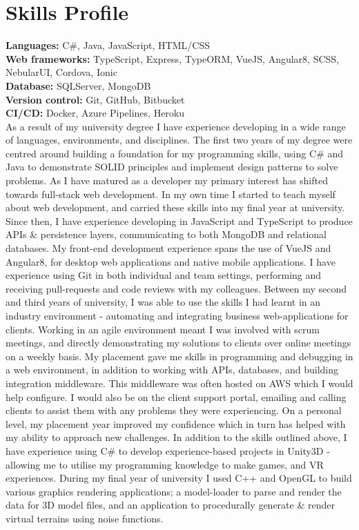 \documentclass[11pt]{article}
\begin{document}
\section*{Skills Profile}
{\bf Languages: } C\#, Java, JavaScript, HTML/CSS\\
{\bf Web frameworks: } TypeScript, Express, TypeORM, VueJS, Angular8, SCSS, NebularUI, Cordova, Ionic\\
{\bf Database: } SQLServer, MongoDB\\
{\bf Version control: } Git, GitHub, Bitbucket\\
{\bf CI/CD: } Docker, Azure Pipelines, Heroku\\[5pt]
As a result of my university degree I have experience developing in a wide range of languages, environments, and disciplines. The first two years of my degree were centred around building a foundation for my programming skills, using C\# and Java to demonstrate SOLID principles and implement design patterns to solve problems. As I have matured as a developer my primary interest has shifted towards full-stack web development. In my own time I started to teach myself about web development, and carried these skills into my final year at university. Since then, I have experience developing in JavaScript and TypeScript to produce APIs \& persistence layers, communicating to both MongoDB and relational databases. My front-end development experience spans the use of VueJS and Angular8, for desktop web applications and native mobile applications. I have experience using Git in both individual and team settings, performing and receiving pull-requests and code reviews with my colleagues.
\newline\newline
Between my second and third years of university, I was able to use the skills I had learnt in an industry environment - automating and integrating business web-applications for clients. Working in an agile environment meant I was involved with scrum meetings, and directly demonstrating my solutions to clients over online meetings on a weekly basis. My placement gave me skills in programming and debugging in a web environment, in addition to working with APIs, databases, and building integration middleware. This middleware was often hosted on AWS which I would help configure. I would also be on the client support portal, emailing and calling clients to assist them with any problems they were experiencing. On a personal level, my placement year improved my confidence which in turn has helped with my ability to approach new challenges.
\newline\newline
In addition to the skills outlined above, I have experience using C\# to develop experience-based projects in Unity3D - allowing me to utilise my programming knowledge to make games, and VR experiences. During my final year of university I used C++ and OpenGL to build various graphics rendering applications;  a model-loader to parse and render the data for 3D model files, and an application to procedurally generate \& render virtual terrains using noise functions.
\end{document}
